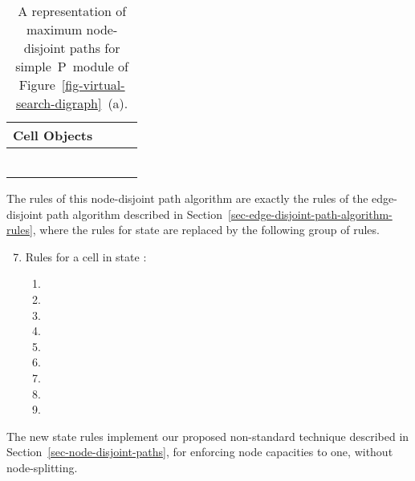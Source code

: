 \documentclass[preliminary,copyright,creativecommons]{eptcs}
\theoremstyle{remark}
\begin{document}
\setcounter{table}{\thefigure}
\begin{table}[ht]
\caption{A representation of maximum node-disjoint paths for simple~P~module of
Figure~\ref{fig-virtual-search-digraph}~(a).}
\label{tab-node-output-objects}
\begin{center}
\begin{tabular}{ | c | c | c | c | } \hline
Cell  Objects &  &  &  \\ \hline 
 &  &  &  \\ \hline
 &  &  &  \\ \hline
 &  &  &  \\ \hline
 &  &  &  \\ \hline
 &  &  &  \\ \hline
 &  &  &  \\ \hline
\end{tabular}
\end{center}
\end{table}
\addtocounter{figure}{1}

The rules of this node-disjoint path algorithm are exactly 
the rules of the edge-disjoint path algorithm described in 
Section~\ref{sec-edge-disjoint-path-algorithm-rules},
where the rules for state  are replaced by the following group of rules.

  \begin{enumerate}
  \setcounter{enumi}{6}
  \item Rules for a cell  in state :
    \begin{enumerate}[1]

    \item 
    \item 

    \item 
    \item 
    \item 

    \item 
    \item 

    \item 
    \item 
    \end{enumerate}

  \end{enumerate}

The new state  rules implement our proposed non-standard technique 
described in Section~\ref{sec-node-disjoint-paths}, 
for enforcing node capacities to one, 
without node-splitting.
\end{document}
